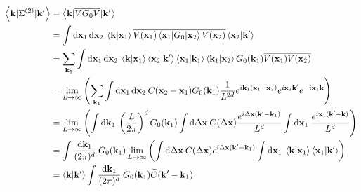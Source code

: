 \begin{align}
\left\langle \mathbf{k} | \Sigma^{(2)} | \mathbf{k}' \right\rangle &= \left\langle \mathbf{k} | \overline{V G_0 V} | \mathbf{k}' \right\rangle \\
&= \int{ \mathop{}\mathopen{}\mathrm{d}\mathbf{x}_{\mathrm{1}} \mathop{}\mathopen{}\mathrm{d}\mathbf{x}_{\mathrm{2}} \: \left\langle \mathbf{k} | \mathbf{x}_{\mathrm{1}} \right\rangle \overline{V(\mathbf{x}_{\mathrm{1}}) \left\langle \mathbf{x}_{\mathrm{1}} | G_0 | \mathbf{x}_{\mathrm{2}}\right\rangle V(\mathbf{x}_{\mathrm{2}}) } \left\langle \mathbf{x}_{\mathrm{2}} |\mathbf{k}' \right\rangle} \\
&= \sum_{\mathbf{k}_{\mathrm{1}}}{\int{\mathop{}\mathopen{}\mathrm{d}\mathbf{x}_{\mathrm{1}} \mathop{}\mathopen{}\mathrm{d}\mathbf{x}_{\mathrm{2}} \: \left\langle \mathbf{k} |\mathbf{x}_{\mathrm{1}} \right\rangle \left\langle \mathbf{x}_{\mathrm{2}} | \mathbf{k}' \right\rangle \left\langle \mathbf{x}_{\mathrm{1}} | \mathbf{k}_{\mathrm{1}} \right\rangle \left\langle \mathbf{k}_{\mathrm{1}} | \mathbf{x}_{\mathrm{2}} \right\rangle G_0(\mathbf{k}_{\mathrm{1}})\overline{V(\mathbf{x}_{\mathrm{1}})V(\mathbf{x}_{\mathrm{2}})}}} \\
&= \lim\limits_{L\rightarrow\infty} \left( \sum_{\mathbf{k}_{\mathrm{1}}}{\int{\mathop{}\mathopen{}\mathrm{d}\mathbf{x}_{\mathrm{1}}\mathop{}\mathopen{}\mathrm{d}\mathbf{x}_{\mathrm{2}}\: C(\mathbf{x}_{\mathrm{2}}-\mathbf{x}_{\mathrm{1}}) G_0(\mathbf{k}_{\mathrm{1}}) \frac{1}{L^{2d}} e^{i \mathbf{k}_{\mathrm{1}}(\mathbf{x}_{\mathrm{1}}-\mathbf{x}_{\mathrm{2}})} e^{i \mathbf{x}_{\mathrm{2}} \mathbf{k}'} e^{-i \mathbf{x}_{\mathrm{1}} \mathbf{k}} }} \right) \\
&= \lim\limits_{L\rightarrow\infty} \left( \int{\mathop{}\mathopen{}\mathrm{d}\mathbf{k}_{\mathrm{1}} \: \left(\frac{L}{2\pi}\right)^d G_0(\mathbf{k}_{\mathrm{1}}) \int{\mathop{}\mathopen{}\mathrm{d}\Delta\mathbf{x} \: C(\Delta\mathbf{x}) \frac{e^{i \Delta\mathbf{x}(\mathbf{k}'-\mathbf{k}_{\mathrm{1}})}}{L^d}} \int{\mathop{}\mathopen{}\mathrm{d}\mathbf{x}_{\mathrm{1}} \: \frac{e^{i \mathbf{x}_{\mathrm{1}}(\mathbf{k}'-\mathbf{k})}}{L^d}} } \right) \\
&=\int{\frac{\mathop{}\mathopen{}\mathrm{d}\mathbf{k}_{\mathrm{1}}}{(2\pi)^d} \: G_0(\mathbf{k}_{\mathrm{1}}) \lim\limits_{L\rightarrow\infty}\left( \int{\mathop{}\mathopen{}\mathrm{d}\Delta\mathbf{x} \: C(\Delta\mathbf{x}) e^{i\Delta\mathbf{x}(\mathbf{k}'-\mathbf{k}_{\mathrm{1}})}} \int{\mathop{}\mathopen{}\mathrm{d}\mathbf{x}_{\mathrm{1}} \: \left\langle \mathbf{k} | \mathbf{x}_{\mathrm{1}}\right\rangle \left\langle \mathbf{x}_{\mathrm{1}} | \mathbf{k}' \right\rangle } \right)} \\
&= \left\langle \mathbf{k} | \mathbf{k}' \right\rangle \int{\frac{\mathop{}\mathopen{}\mathrm{d}\mathbf{k}_{\mathrm{1}}}{(2\pi)^d} \: G_0(\mathbf{k}_{\mathrm{1}}) \widetilde{C}(\mathbf{k}'-\mathbf{k}_{\mathrm{1}})}
\end{align}








